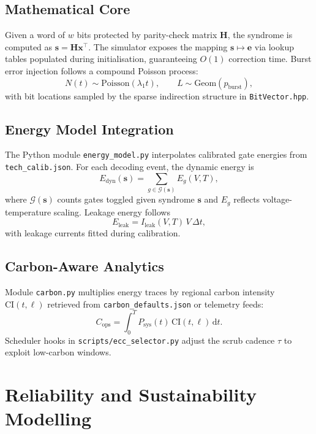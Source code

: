\documentclass[conference]{IEEEtran}
\begin{document}
\subsection{Mathematical Core}
Given a word of $w$ bits protected by parity-check matrix $\mathbf{H}$, the syndrome is computed as $\mathbf{s}=\mathbf{H}\mathbf{x}^{\top}$.
The simulator exposes the mapping $\mathbf{s}\mapsto \mathbf{e}$ via lookup tables populated during initialisation, guaranteeing $O(1)$ correction time.
Burst error injection follows a compound Poisson process:
\begin{equation}
N(t) \sim \text{Poisson}(\lambda_{1} t),\qquad L \sim \text{Geom}(p_{\text{burst}}),
\end{equation}
with bit locations sampled by the sparse indirection structure in \texttt{BitVector.hpp}.

\subsection{Energy Model Integration}
The Python module \texttt{energy\_model.py} interpolates calibrated gate energies from \texttt{tech\_calib.json}.
For each decoding event, the dynamic energy is
\begin{equation}
E_{\text{dyn}}(\mathbf{s}) = \sum_{g \in \mathcal{G}(\mathbf{s})} E_{g}(V, T),
\end{equation}
where $\mathcal{G}(\mathbf{s})$ counts gates toggled given syndrome $\mathbf{s}$ and $E_{g}$ reflects voltage-temperature scaling.
Leakage energy follows
\begin{equation}
E_{\text{leak}} = I_{\text{leak}}(V,T)\,V\,\Delta t,
\end{equation}
with leakage currents fitted during calibration.

\subsection{Carbon-Aware Analytics}
Module \texttt{carbon.py} multiplies energy traces by regional carbon intensity $\text{CI}(t,\ell)$ retrieved from \texttt{carbon\_defaults.json} or telemetry feeds:
\begin{equation}
C_{\text{ops}} = \int_{0}^{T} P_{\text{sys}}(t)\,\text{CI}(t,\ell)\,\mathrm{d}t.
\end{equation}
Scheduler hooks in \texttt{scripts/ecc\_selector.py} adjust the scrub cadence $\tau$ to exploit low-carbon windows.

\section{Reliability and Sustainability Modelling}
\end{document}
